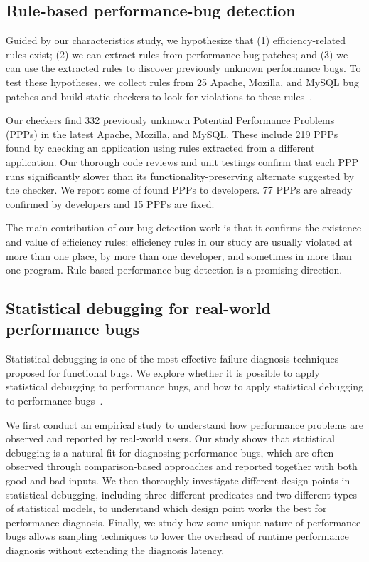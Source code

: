 \subsection{Rule-based performance-bug detection}

Guided by our characteristics study, we hypothesize that 
(1) efficiency-related rules exist; 
(2) we can extract rules from performance-bug patches; 
and (3) we can use the extracted rules to discover previously unknown performance bugs. 
To test these hypotheses, we collect rules from 25 Apache, Mozilla, and MySQL bug patches 
and build static checkers to look for violations to these rules~\citep{PerfBug}.

Our checkers find 332 previously unknown Potential Performance Problems (PPPs) 
in the latest Apache, Mozilla, and MySQL. 
These include 219 PPPs found by checking an application using rules extracted from a different application. 
Our thorough code reviews and unit testings confirm that each PPP runs significantly slower 
than its functionality-preserving alternate suggested by the checker. 
We report some of found PPPs to developers. 
77 PPPs are already confirmed by developers and 15 PPPs are fixed.  

The main contribution of our bug-detection work is that it 
confirms the existence and value of efficiency rules: 
efficiency rules in our study are usually violated at more than one place, 
by more than one developer, 
and sometimes in more than one program. 
Rule-based performance-bug detection is a promising direction. 

\subsection{Statistical debugging for real-world performance bugs}
Statistical debugging is one of the most effective failure diagnosis techniques proposed for functional bugs. 
We explore whether it is possible to apply statistical debugging to performance bugs, 
and how to apply statistical debugging to performance bugs~\citep{SongOOPSLA2014}. 

We first conduct an empirical study to understand how performance problems are observed and reported by real-world users. 
Our study shows that statistical debugging is a natural fit for diagnosing performance bugs, 
which are often observed through comparison-based approaches and reported together with both good and bad inputs. 
We then thoroughly investigate different design points in statistical debugging, 
including three different predicates and two different types of statistical models, 
to understand which design point works the best for performance diagnosis. 
Finally, we study how some unique nature of performance bugs allows sampling techniques 
to lower the overhead of runtime performance diagnosis without extending the diagnosis latency. 

